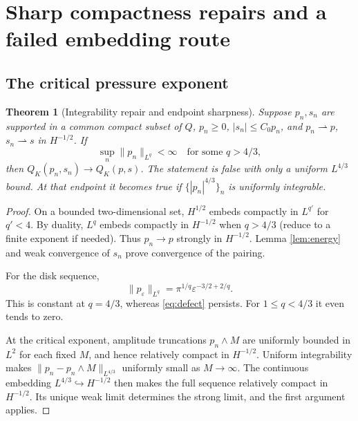 \documentclass[11pt,a4paper]{article}
\newtheorem{theorem}{Theorem}[section]
\theoremstyle{definition}\newtheorem{definition}[theorem]{Definition}
\theoremstyle{remark}\newtheorem{remark}[theorem]{Remark}
\newcommand{\norm}[1]{\lVert #1\rVert}
\newcommand{\weak}{\rightharpoonup}
\numberwithin{equation}{section}
\begin{document}
\section{Sharp compactness repairs and a failed embedding route}\label{sec:repairs}
\subsection{The critical pressure exponent}
\begin{theorem}[Integrability repair and endpoint sharpness]\label{thm:Lq}
Suppose $p_n,s_n$ are supported in a common compact subset of $Q$, $p_n\ge0$, $|s_n|\le C_0p_n$, and
$p_n\weak p$, $s_n\weak s$ in $H^{-1/2}$. If
\[
 \sup_n\norm{p_n}_{L^q}<\infty\quad\text{for some }q>4/3,
\]
then $Q_K(p_n,s_n)\to Q_K(p,s)$. The statement is false with only a uniform $L^{4/3}$ bound. At that endpoint it becomes true if $\{|p_n|^{4/3}\}_n$ is uniformly integrable.
\end{theorem}
\begin{proof}
On a bounded two-dimensional set, $H^{1/2}$ embeds compactly in $L^{q'}$ for $q'<4$. By duality, $L^q$ embeds compactly in $H^{-1/2}$ when $q>4/3$ (reduce to a finite exponent if needed). Thus $p_n\to p$ strongly in $H^{-1/2}$. Lemma \ref{lem:energy} and weak convergence of $s_n$ prove convergence of the pairing.

For the disk sequence,
\begin{equation}\label{eq:Lqscaling}
 \norm{p_\varepsilon}_{L^q}=\pi^{1/q}\varepsilon^{-3/2+2/q}.
\end{equation}
This is constant at $q=4/3$, whereas \eqref{eq:defect} persists. For $1\le q<4/3$ it even tends to zero.

At the critical exponent, amplitude truncations $p_n\wedge M$ are uniformly bounded in $L^2$ for each fixed $M$, and hence relatively compact in $H^{-1/2}$. Uniform integrability makes
$\norm{p_n-p_n\wedge M}_{L^{4/3}}$ uniformly small as $M\to\infty$. The continuous embedding $L^{4/3}\hookrightarrow H^{-1/2}$ then makes the full sequence relatively compact in $H^{-1/2}$. Its unique weak limit determines the strong limit, and the first argument applies.
\end{proof}
\end{document}
